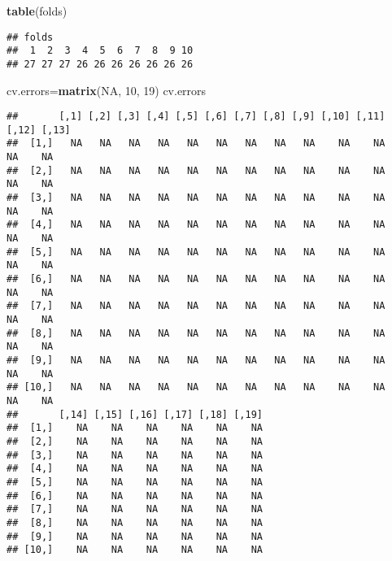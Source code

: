 \documentclass[]{article}
\newenvironment{Shaded}{\begin{snugshade}}{\end{snugshade}}
\newcommand{\KeywordTok}[1]{\textcolor[rgb]{0.13,0.29,0.53}{\textbf{#1}}}
\newcommand{\DecValTok}[1]{\textcolor[rgb]{0.00,0.00,0.81}{#1}}
\newcommand{\OtherTok}[1]{\textcolor[rgb]{0.56,0.35,0.01}{#1}}
\newcommand{\NormalTok}[1]{#1}
\begin{document}
\begin{Shaded}
\begin{Highlighting}[]
\KeywordTok{table}\NormalTok{(folds)}
\end{Highlighting}
\end{Shaded}

\begin{verbatim}
## folds
##  1  2  3  4  5  6  7  8  9 10 
## 27 27 27 26 26 26 26 26 26 26
\end{verbatim}

\begin{Shaded}
\begin{Highlighting}[]
\NormalTok{cv.errors=}\KeywordTok{matrix}\NormalTok{(}\OtherTok{NA}\NormalTok{, }\DecValTok{10}\NormalTok{, }\DecValTok{19}\NormalTok{)}
\NormalTok{cv.errors}
\end{Highlighting}
\end{Shaded}

\begin{verbatim}
##       [,1] [,2] [,3] [,4] [,5] [,6] [,7] [,8] [,9] [,10] [,11] [,12] [,13]
##  [1,]   NA   NA   NA   NA   NA   NA   NA   NA   NA    NA    NA    NA    NA
##  [2,]   NA   NA   NA   NA   NA   NA   NA   NA   NA    NA    NA    NA    NA
##  [3,]   NA   NA   NA   NA   NA   NA   NA   NA   NA    NA    NA    NA    NA
##  [4,]   NA   NA   NA   NA   NA   NA   NA   NA   NA    NA    NA    NA    NA
##  [5,]   NA   NA   NA   NA   NA   NA   NA   NA   NA    NA    NA    NA    NA
##  [6,]   NA   NA   NA   NA   NA   NA   NA   NA   NA    NA    NA    NA    NA
##  [7,]   NA   NA   NA   NA   NA   NA   NA   NA   NA    NA    NA    NA    NA
##  [8,]   NA   NA   NA   NA   NA   NA   NA   NA   NA    NA    NA    NA    NA
##  [9,]   NA   NA   NA   NA   NA   NA   NA   NA   NA    NA    NA    NA    NA
## [10,]   NA   NA   NA   NA   NA   NA   NA   NA   NA    NA    NA    NA    NA
##       [,14] [,15] [,16] [,17] [,18] [,19]
##  [1,]    NA    NA    NA    NA    NA    NA
##  [2,]    NA    NA    NA    NA    NA    NA
##  [3,]    NA    NA    NA    NA    NA    NA
##  [4,]    NA    NA    NA    NA    NA    NA
##  [5,]    NA    NA    NA    NA    NA    NA
##  [6,]    NA    NA    NA    NA    NA    NA
##  [7,]    NA    NA    NA    NA    NA    NA
##  [8,]    NA    NA    NA    NA    NA    NA
##  [9,]    NA    NA    NA    NA    NA    NA
## [10,]    NA    NA    NA    NA    NA    NA
\end{verbatim}
\end{document}
